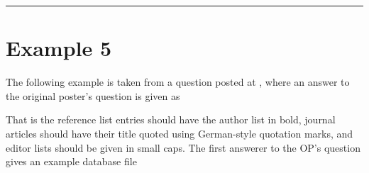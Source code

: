 \documentclass[letterpaper,10pt,english]{sphinxmanual}
\begin{document}
\bigskip\hrule\bigskip



\section{Example 5}
\label{\detokenize{examples:example-5}}
The following example is taken from a question posted at , where an answer to the original poster’s question is given as

\noindent{}

That is the reference list entries should have the author list in bold, journal articles should have their title quoted using German-style quotation marks, and editor lists should be given in small caps. The first answerer to the OP’s question gives an example database file
\end{document}
